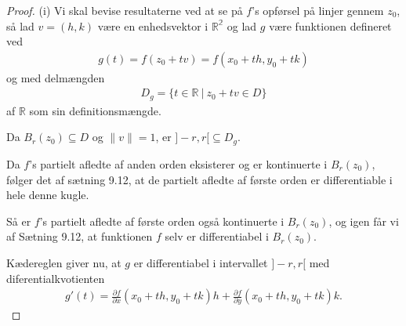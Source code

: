 \begin{proof}
  (i) Vi skal bevise resultaterne ved at se på $f$'s opførsel på linjer gennem $z_0$, så lad $v = (h,k)$ være en enhedsvektor i $\mathbb{R^2}$ og lad $g$ være funktionen defineret ved
  \begin{align*}
    g(t) = f(z_0 + tv) = f(x_0 + th, y_0 + tk)
  \end{align*}
  og med delmængden
  \begin{align*}
    D_g = \{t \in \mathbb{R} \ | \ z_0 + tv \in D\}
  \end{align*}
  af $\mathbb{R}$ som sin definitionsmængde.

  Da $B_r(z_0) \subseteq D$ og $\| v \| = 1$, er $]-r,r[ \subseteq D_g$.

  Da $f$'s partielt afledte af anden orden eksisterer og er kontinuerte i $B_r(z_0)$, følger det af sætning 9.12, at de partielt afledte af første orden er differentiable i hele denne kugle.

  Så er $f$'s partielt afledte af første orden også kontinuerte i $B_r(z_0)$, og igen får vi af Sætning 9.12, at funktionen $f$ selv er differentiabel i $B_r(z_0)$.

  Kædereglen giver nu, at $g$ er differentiabel i intervallet $]-r,r[$ med diferentialkvotienten
  \begin{align}\label{9.35}
    g'(t) = \frac{\partial f}{\partial x} (x_0 + th, y_0 + tk)h + \frac{\partial f}{\partial y}(x_0 + th, y_0 + tk)k.
  \end{align}


\end{proof}
